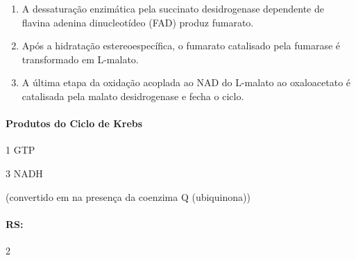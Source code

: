 \documentclass[\mainfilename]{subfiles}
\begin{document}
\begin{questionBox}
\begin{questionBox}
\begin{enumerate}
            \item A dessaturação enzimática pela succinato desidrogenase dependente de flavina adenina dinucleotídeo (FAD) produz fumarato.
            
            \item Após a hidratação estereoespecífica, o fumarato catalisado pela fumarase é transformado em L-malato.
            
            \item A última etapa da oxidação acoplada ao NAD do L-malato ao oxaloacetato é catalisada pela malato desidrogenase e fecha o ciclo.
        \end{enumerate}

        \paragraph{Produtos do Ciclo de Krebs}
        \begin{itemize}
            \begin{multicols}{2}
                \item 1 GTP
                \item 3 NADH
                \item {} (convertido em  na presença da coenzima Q (ubiquinona))
                \item {}
            \end{multicols}
        \end{itemize}

        
    \end{questionBox}

    \paragraph{RS:}2
    
\end{questionBox}
\end{document}
